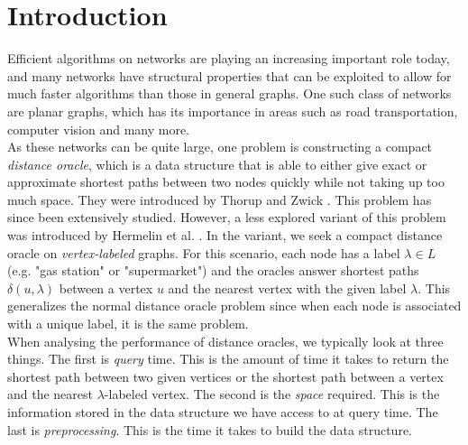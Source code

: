 \section{Introduction}\label{introduction}
Efficient algorithms on networks are playing an increasing important role today, and many
networks have structural properties that can be exploited to allow for much faster
algorithms than those in general graphs. One such class of networks are planar graphs,
which has its importance in
areas such as road transportation, computer vision and many more. \\
As these networks can be quite large, one problem is constructing a compact \textit{distance
oracle}, which is a data structure that is able to either give exact or approximate
shortest paths between two nodes quickly while not taking up too much space. They were
introduced by Thorup and Zwick \cite{thorup2005approximate}. This problem has since been
extensively studied. However, a less explored variant of this problem
was introduced by Hermelin et al. \cite{hermelin2011distance}. In the variant, we seek a
compact distance oracle on \textit{vertex-labeled} graphs. For this scenario, each node
has a label $\lambda\in L$ (e.g. "gas
station" or "supermarket") and the oracles answer shortest paths $\delta(u,\lambda)$ between a
vertex $u$ and
the nearest vertex with the given label $\lambda$. This generalizes the normal distance oracle problem since when each node is
associated with a unique label, it is the same problem. \\
When analysing the performance of
distance oracles, we typically look at three things. The first is \textit{query} time.
This is the amount of time it takes to return the shortest path between two given
vertices or the shortest path between a vertex and the nearest $\lambda$-labeled vertex.
The second is the \textit{space} required. This is the information stored in the data
structure we have access to at query time. The last is \textit{preprocessing}. This is
the time it takes to build the data structure. \\

